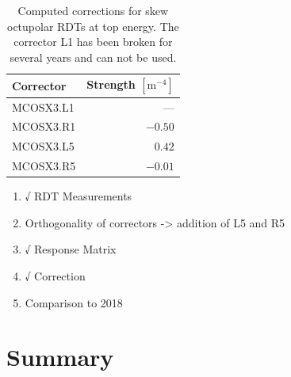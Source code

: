 \begin{table}[!htb]
    \centering
    \begin{tabular}{lr}
      \toprule
      Corrector    &    Strength $[\text{m}^{-4}]$ \\
      \midrule
      MCOSX3.L1    &                —  \\
      MCOSX3.R1    &           $-0.50$ \\
      MCOSX3.L5    &           $ 0.42$ \\
      MCOSX3.R5    &           $-0.01$ \\
      \bottomrule
    \end{tabular}
    \caption{Computed corrections for skew octupolar RDTs at top energy. The corrector L1 has been 
    broken for several years and can not be used.}
    \label{tab:skew_octupolar:correction_strengths}
  \end{table}
  



\begin{enumerate}
    \color{red}
    \item √ RDT Measurements
    \item Orthogonality of correctors -> addition of L5 and R5
    \item √ Response Matrix
    \item √ Correction
    \item Comparison to 2018
\end{enumerate}



%
%



\section{}



\section{Summary}